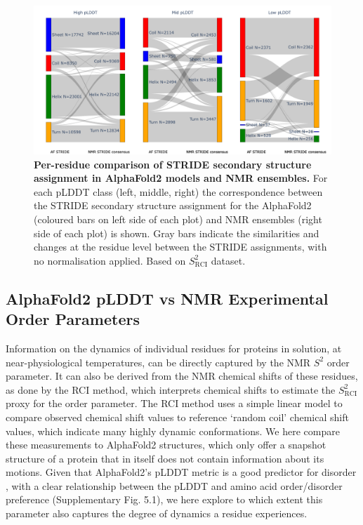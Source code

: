 \begin{figure}[ht]
    \centering
    \includegraphics[width=1\textwidth]{pLDDT/plddt_figures/sankey_ss_af_stride_af_ss_nmr_strideCons.pdf}
    \caption{\textbf{Per-residue comparison of STRIDE secondary structure assignment in AlphaFold2 models and NMR ensembles.}
    For each pLDDT class (left, middle, right) the correspondence between the STRIDE secondary structure assignment for the AlphaFold2 (coloured bars on left side of each plot) and NMR ensembles (right side of each plot) is shown. Gray bars indicate the similarities and changes at the residue level between the STRIDE assignments, with no normalisation applied.
    Based on $S^2_{\text{RCI}}$ dataset.}
    \label{fig:sankey}
\end{figure}


\subsection{AlphaFold2 pLDDT vs NMR Experimental Order Parameters}

Information on the dynamics of individual residues for proteins in solution, at near-physiological temperatures, can be directly captured by the NMR $S^{2}$ order parameter. It can also be derived from the NMR chemical shifts of these residues, as done by the RCI method, which interprets chemical shifts to estimate the $S^{2}_{\text{RCI}}$ proxy for the order parameter. The RCI method uses a simple linear model to compare observed chemical shift values to reference `random coil' chemical shift values, which indicate many highly dynamic conformations. We here compare these measurements to AlphaFold2 structures, which only offer a snapshot structure of a protein that in itself does not contain information about its motions. Given that AlphaFold2's pLDDT metric is a good predictor for disorder \cite{piovesan_intrinsic_2022}, with a clear relationship between the pLDDT and amino acid order/disorder preference (Supplementary Fig. 5.1),
we here explore to which extent this parameter also captures the degree of dynamics a residue experiences.

